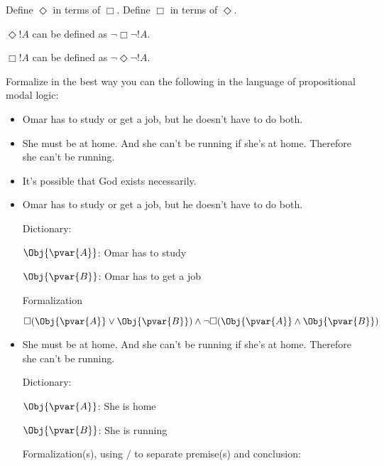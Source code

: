 \documentclass[../../../include/open-logic-section]{subfiles}
\begin{document}


\begin{prob}
    Define $\Diamond$ in terms of $\Box$. Define $\Box$ in terms of $\Diamond$.
    \begin{ans}
    $\Diamond!A$ can be defined as $\lnot\Box\lnot!A$. 

    $\Box!A$ can be defined as $\lnot\Diamond\lnot!A$.
    \end{ans}
\end{prob}

\begin{prob}
    Formalize in the best way you can the following in the language
    of propositional modal logic:
    \begin{itemize}
        \item Omar has to study or get a job, but he doesn't have to do both.
        \item She must be at home. And she can't be running if she's at home.
        Therefore she can't be running.
        \item It's possible that God exists necessarily.
    \end{itemize}

    \begin{ans}
    \begin{itemize}
        \item Omar has to study or get a job, but he doesn't have to do both.
        
        Dictionary:
        
        $\Obj{\pvar{A}}$: Omar has to study

        $\Obj{\pvar{B}}$: Omar has to get a job

        Formalization

        $\Box(\Obj{\pvar{A}}\lor\Obj{\pvar{B}}) \land 
            \lnot\Box(\Obj{\pvar{A}}\land\Obj{\pvar{B}})$
        
        \item She must be at home. And she can't be running if she's at home.
        Therefore she can't be running.
        
        Dictionary:
        
        $\Obj{\pvar{A}}$: She is home
        
        $\Obj{\pvar{B}}$: She is running

        Formalization(s), using $/$ to separate premise(s) and
        conclusion:


\end{itemize}
\end{ans}
\end{prob}
\end{document}
